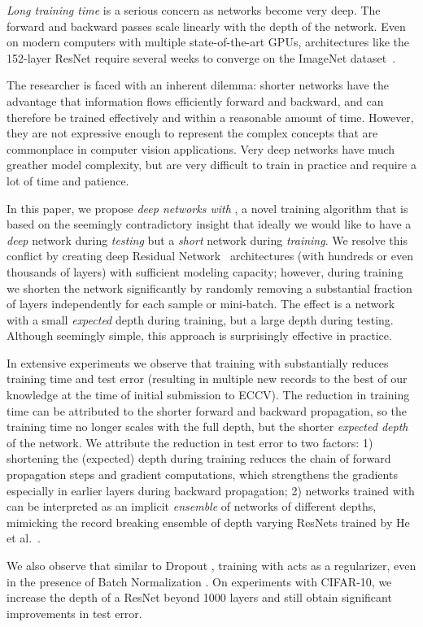 \emph{Long training time} is a serious concern as networks become very deep. The forward and backward passes scale linearly with the depth of the network. Even on modern computers with multiple state-of-the-art GPUs, architectures like the 152-layer ResNet require several weeks to converge on the ImageNet dataset~\cite{he2015deep}.

The researcher is faced with an inherent dilemma:
shorter networks have the advantage that information flows efficiently forward and backward, and can therefore be trained effectively and within a reasonable amount of time. However, they are not expressive enough to represent the complex concepts that are commonplace in computer vision applications. Very deep networks have much greather model complexity, but are very difficult to train in practice and require a lot of time and patience.

In this paper, we propose \emph{deep networks with \name{}}, a novel training algorithm that is based on the seemingly contradictory insight that ideally we would like to have a \emph{deep} network during \emph{testing} but a \emph{short} network during \emph{training}. We resolve this conflict by creating deep Residual Network~\cite{he2015deep} architectures (with hundreds or even thousands of layers) with sufficient modeling capacity; however, during training  we shorten the network significantly by randomly removing a substantial fraction of layers independently for each sample or mini-batch.
The effect is a network with a small \emph{expected} depth during training, but a large depth during testing. Although seemingly simple, this approach is surprisingly effective in practice.

In extensive experiments we observe that training with \name{} substantially reduces training time and test error (resulting in multiple new records to the best of our knowledge at the time of initial submission to ECCV).
The reduction in training time can be attributed to the shorter forward and backward propagation, so the training time no longer scales with the full depth, but the shorter \emph{expected depth} of the network. We attribute the reduction in test error to two factors: 1) shortening the (expected) depth during training reduces the chain of forward propagation steps and gradient computations, which strengthens the gradients especially in earlier layers during backward propagation; 2) networks trained with \name{} can be interpreted as an implicit \emph{ensemble} of networks of different depths, mimicking the record breaking ensemble of depth varying ResNets trained by He et al.~\cite{he2015deep}.

We also observe that similar to Dropout \cite{srivastava2014dropout}, training with \name{} acts as a regularizer, even in the presence of Batch Normalization \cite{ioffe2015batch}. On experiments with CIFAR-10, we increase the depth of a ResNet beyond 1000 layers and still obtain significant improvements in test error.
